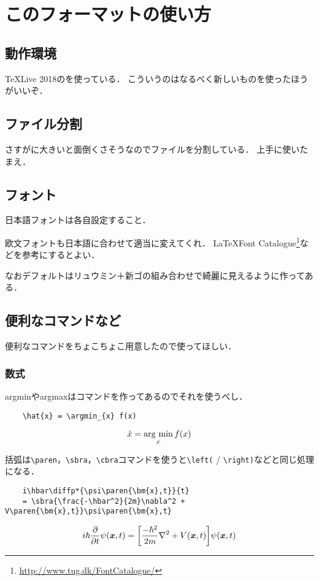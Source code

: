 \section{このフォーマットの使い方}
\label{sec:02-hoge}

\subsection{動作環境}

\TeX{}Live 2018の\upLaTeX{}を使っている．
こういうのはなるべく新しいものを使ったほうがいいぞ．

\subsection{ファイル分割}

さすがに大きいと面倒くさそうなのでファイルを分割している．
上手に使いたまえ．

\subsection{フォント}
\label{ssec:02-hoge-font}

日本語フォントは各自設定すること．

欧文フォントも日本語に合わせて適当に変えてくれ．
\LaTeX Font Catalogue\footnote{\url{http://www.tug.dk/FontCatalogue/}}などを参考にするとよい．

なおデフォルトはリュウミン＋新ゴの組み合わせで綺麗に見えるように作ってある．

\subsection{便利なコマンドなど}
\label{ssec:02-hoge-commands}

便利なコマンドをちょこちょこ用意したので使ってほしい．

\subsubsection{数式}

argminやargmaxはコマンドを作ってあるのでそれを使うべし．
\begin{verbatim}
    \hat{x} = \argmin_{x} f(x)
\end{verbatim}
\begin{equation}
    \hat{x} = \operatorname*{arg~min}_{x} f(x)
    \label{eq:eq1}
\end{equation}

括弧は\verb|\paren|，\verb|\sbra|，\verb|\cbra|コマンドを使うと\verb|\left(| / \verb|\right)|などと同じ処理になる．
\begin{verbatim}
    i\hbar\diffp*{\psi\paren{\bm{x},t}}{t}
    = \sbra{\frac{-\hbar^2}{2m}\nabla^2 + V\paren{\bm{x},t}}\psi\paren{\bm{x},t}
\end{verbatim}
\begin{equation}
    i\hbar\diffp*{\psi\paren{\bm{x},t}}{t} = \sbra{\frac{-\hbar^2}{2m}\nabla^2 + V\paren{\bm{x},t}}\psi\paren{\bm{x},t}
    \label{eq:eq2}
\end{equation}

